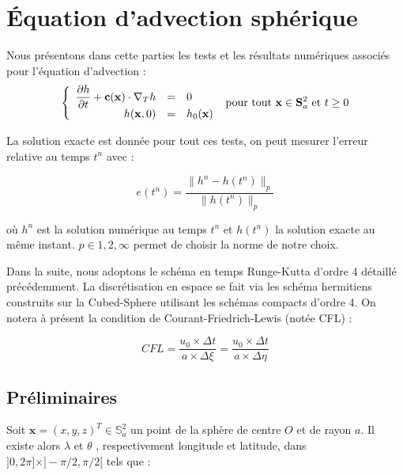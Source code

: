 
\chapter{\'Equation d'advection sphérique}

Nous présentons dans cette parties les tests et les résultats numériques associés pour l'équation d'advection :
\begin{equation}
\label{eq:advection spherique}
\left\lbrace
\begin{array}{r cl}
\dfrac{\partial h}{\partial t} + \mathbf{c} ( \mathbf{x} ) \cdot \nabla_ T h & = & 0 \\
h(\mathbf{x},0) & = & h_0 ( \mathbf{x} )
\end{array}
\right. \text{ pour tout } \mathbf{x} \in \mathbf{S}_a^2 \text{ et } t \geq 0
\end{equation}

La solution exacte est donnée pour tout ces tests, on peut mesurer l'erreur relative au temps $t^n$ avec :

\begin{equation}
\label{erreur relative}
e(t^n) = \dfrac{\| h^n - h(t^n) \|_p}{\| h(t^n) \|_p}
\end{equation}

où $h^n$ est la solution numérique au temps $t^n$ et $h(t^n)$ la solution exacte au même instant. $p \in {1, 2, \infty }$ permet de choisir la norme de notre choix.

Dans la suite, nous adoptons le schéma en temps Runge-Kutta d'ordre 4 détaillé précédemment. La discrétisation en espace se fait via les schéma hermitiens construits sur la Cubed-Sphere utilisant les schémas compacts d'ordre 4. On notera à présent la condition de Courant-Friedrich-Lewis (notée CFL) :

\begin{equation}
CFL = \dfrac{u_0 \times \Delta t}{a \times \Delta \xi} = \dfrac{u_0 \times \Delta t}{a \times \Delta \eta}
\end{equation}

\section{Préliminaires}

Soit $\mathbf{x} = (x,y,z)^T \in \mathbb{S}_a^2$ un point de la sphère de centre $O$ et de rayon $a$. Il existe alors $\lambda$ et $\theta$ , respectivement longitude et latitude, dans $] 0, 2 \pi ] \times ] - \pi /2, \pi/2 [ $ tels que :

